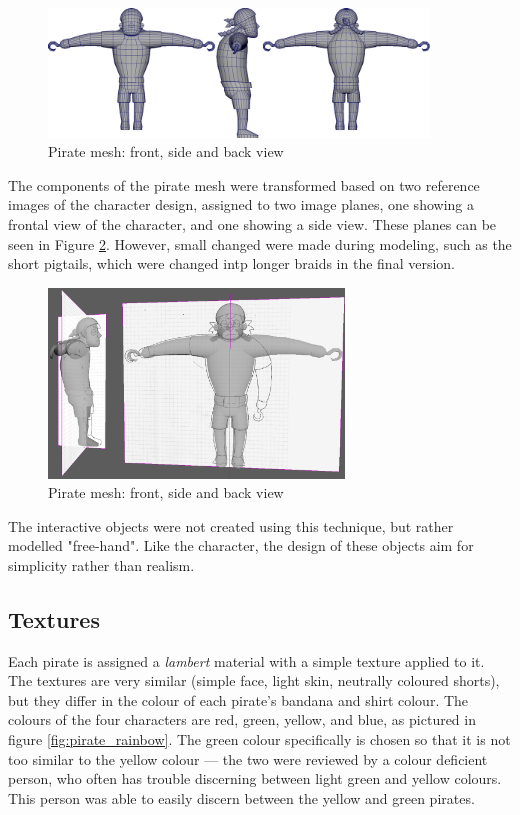 \begin{figure}[h!]
	\centering
	\includegraphics[width=0.9\textwidth]{figures/pirate_mesh.png}
	\caption{Pirate mesh: front, side and back view \label{fig:pirate_mesh}}
\end{figure}

The components of the pirate mesh were transformed based on two reference images of the character design, assigned to two image planes, one showing a frontal view of the character, and one showing a side view. These planes can be seen in Figure \ref{fig:pirate_planes}. However, small changed were made during modeling, such as the short pigtails, which were changed intp longer braids in the final version.

\begin{figure}[h!]
	\centering
	\includegraphics[width=0.7\textwidth]{figures/pirate_planes.png}
	\caption{Pirate mesh: front, side and back view \label{fig:pirate_planes}}
\end{figure}

The interactive objects were not created using this technique, but rather modelled "free-hand". Like the character, the design of these objects aim for simplicity rather than realism.

\subsection{Textures}
Each pirate is assigned a \textit{lambert} material with a simple texture applied to it. The textures are very similar (simple face, light skin, neutrally coloured shorts), but they differ in the colour of each pirate's bandana and shirt colour. The colours of the four characters are red, green, yellow, and blue, as pictured in figure \ref{fig:pirate_rainbow}. The green colour specifically is chosen so that it is not too similar to the yellow colour --- the two were reviewed by a colour deficient person, who often has trouble discerning between light green and yellow colours. This person was able to easily discern between the yellow and green pirates.

